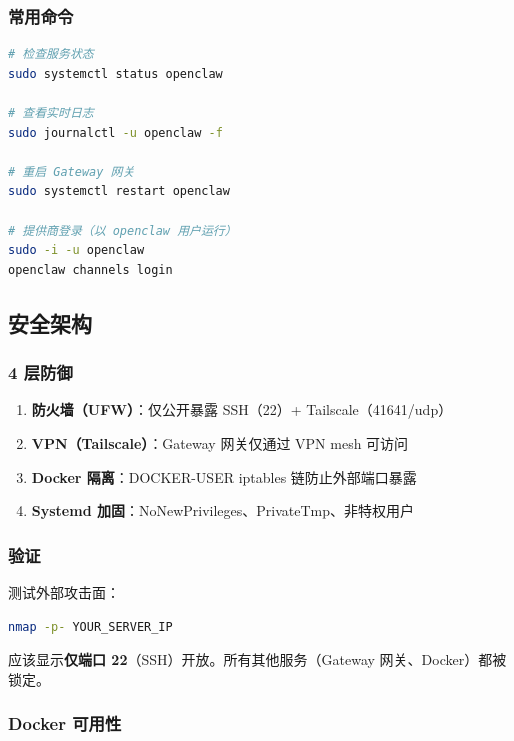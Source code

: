 \subsubsection{常用命令}


\begin{lstlisting}[language=bash]
# 检查服务状态
sudo systemctl status openclaw

# 查看实时日志
sudo journalctl -u openclaw -f

# 重启 Gateway 网关
sudo systemctl restart openclaw

# 提供商登录（以 openclaw 用户运行）
sudo -i -u openclaw
openclaw channels login
\end{lstlisting}


\subsection{安全架构}


\subsubsection{4 层防御}


\begin{enumerate}
  \item \textbf{防火墙（UFW）}：仅公开暴露 SSH（22）+ Tailscale（41641/udp）
  \item \textbf{VPN（Tailscale）}：Gateway 网关仅通过 VPN mesh 可访问
  \item \textbf{Docker 隔离}：DOCKER-USER iptables 链防止外部端口暴露
  \item \textbf{Systemd 加固}：NoNewPrivileges、PrivateTmp、非特权用户
\end{enumerate}


\subsubsection{验证}


测试外部攻击面：

\begin{lstlisting}[language=bash]
nmap -p- YOUR_SERVER_IP
\end{lstlisting}


应该显示\textbf{仅端口 22}（SSH）开放。所有其他服务（Gateway 网关、Docker）都被锁定。

\subsubsection{Docker 可用性}



